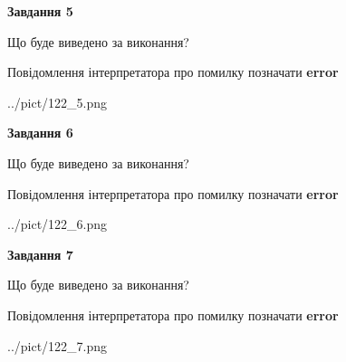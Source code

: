 \documentclass[10pt, ukrainian]{article}
\begin{document}
{\begin {large}
{\begin {center}\textbf{Завдання 5}\end {center}}\par
Що буде виведено за виконання? \par
Повідомлення інтерпретатора про помилку позначати \textbf{error}

\begin{center}
	{../pict/122_5.png}
\end{center}
\newpage

{\begin {center}\textbf{Завдання 6}\end {center}}\par
Що буде виведено за виконання? \par
Повідомлення інтерпретатора про помилку позначати \textbf{error}

\begin{center}
	{../pict/122_6.png}
\end{center}
\newpage

{\begin {center}\textbf{Завдання 7}\end {center}}\par
Що буде виведено за виконання? \par
Повідомлення інтерпретатора про помилку позначати \textbf{error}

\begin{center}
	{../pict/122_7.png}
\end{center}
\newpage

\end {large}}
\end{document}
